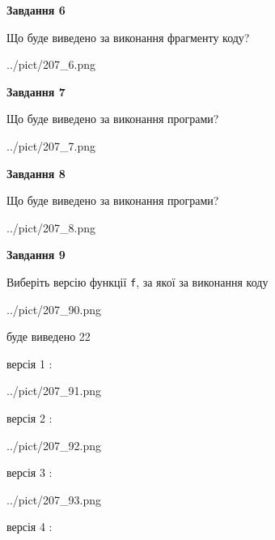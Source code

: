 \documentclass[12pt, ukrainian]{article}
\def\code#1{\Verb!#1!}
\begin{document}
{\begin {large}
{\begin {center}\textbf{Завдання 6}\end {center}}

Що буде виведено за виконання фрагменту коду?\par
\begin{center}
	{../pict/207_6.png}
\end{center}
\newpage

{\begin {center}\textbf{Завдання 7}\end {center}}

Що буде виведено за виконання програми?\par
\begin{center}
	{../pict/207_7.png}
\end{center}
\newpage

{\begin {center}\textbf{Завдання 8}\end {center}}

Що буде виведено за виконання програми?\par
\begin{center}
	{../pict/207_8.png}
\end{center}
\newpage

{\begin {center}\textbf{Завдання 9}\end {center}}

Виберіть версію функції \code{f}, за якої за виконання коду
\begin{center}
	{../pict/207_90.png}
\end{center}
буде виведено 22

\vspace{5mm}
версія 1 :

\begin{center}
	{../pict/207_91.png}
\end{center}
версія 2 :

\begin{center}
	{../pict/207_92.png}
\end{center}
версія 3 :

\begin{center}
	{../pict/207_93.png}
\end{center}
версія 4 :


\end{large}}
\end{document}
